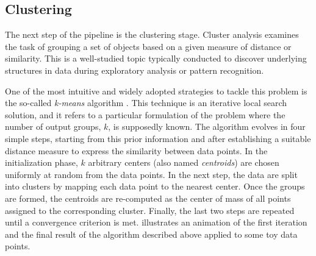 \subsection{Clustering} \label{sec:clustering}

The next step of the pipeline is the clustering stage.
Cluster analysis examines the task of grouping a set of objects based on a given measure of distance or similarity.
This is a well-studied topic typically conducted to discover underlying structures in data during exploratory analysis or pattern recognition.

One of the most intuitive and widely adopted strategies to tackle this problem is the so-called \textit{k-means} algorithm \cite{lloyd1982kmeans}.
This technique is an iterative local search solution, and it refers to a particular formulation of the problem where the number of output groups, $k$, is supposedly known.
The algorithm evolves in four simple steps, starting from this prior information and after establishing a suitable distance measure to express the similarity between data points.
In the initialization phase, $k$ arbitrary centers (also named \textit{centroids}) are chosen uniformly at random from the data points. 
In the next step, the data are split into clusters by mapping each data point to the nearest center. 
Once the groups are formed, the centroids are re-computed as the center of mass of all points assigned to the corresponding cluster.
Finally, the last two steps are repeated until a convergence criterion is met.
 illustrates an animation of the first iteration and the final result of the algorithm described above applied to some toy data points.
